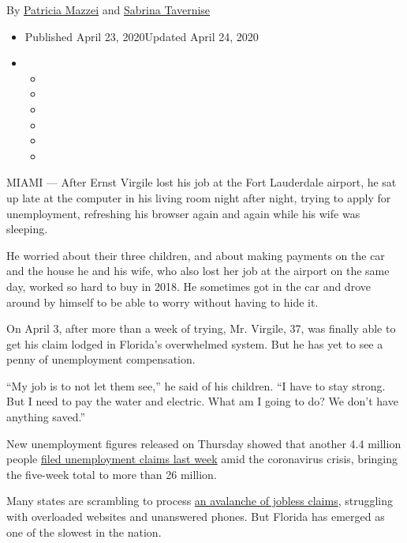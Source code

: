By \href{https://www.nytimes.com/by/patricia-mazzei}{Patricia Mazzei}
and \href{https://www.nytimes.com/by/sabrina-tavernise}{Sabrina
Tavernise}

\begin{itemize}
\item
  Published April 23, 2020Updated April 24, 2020
\item
  \begin{itemize}
  \item
  \item
  \item
  \item
  \item
  \item
  \end{itemize}
\end{itemize}

MIAMI --- After Ernst Virgile lost his job at the Fort Lauderdale
airport, he sat up late at the computer in his living room night after
night, trying to apply for unemployment, refreshing his browser again
and again while his wife was sleeping.

He worried about their three children, and about making payments on the
car and the house he and his wife, who also lost her job at the airport
on the same day, worked so hard to buy in 2018. He sometimes got in the
car and drove around by himself to be able to worry without having to
hide it.

On April 3, after more than a week of trying, Mr. Virgile, 37, was
finally able to get his claim lodged in Florida's overwhelmed system.
But he has yet to see a penny of unemployment compensation.

``My job is to not let them see,'' he said of his children. ``I have to
stay strong. But I need to pay the water and electric. What am I going
to do? We don't have anything saved.''

New unemployment figures released on Thursday showed that another 4.4
million people
\href{https://www.nytimes.com/2020/04/23/business/economy/unemployment-claims-coronavirus.html?action=click\&module=Top\%20Stories\&pgtype=Homepage}{filed
unemployment claims last week} amid the coronavirus crisis, bringing the
five-week total to more than 26 million.

Many states are scrambling to process
\href{https://www.nytimes.com/2020/04/16/business/economy/unemployment-numbers-coronavirus.html}{an
avalanche of jobless claims}, struggling with overloaded websites and
unanswered phones. But Florida has emerged as one of the slowest in the
nation.

